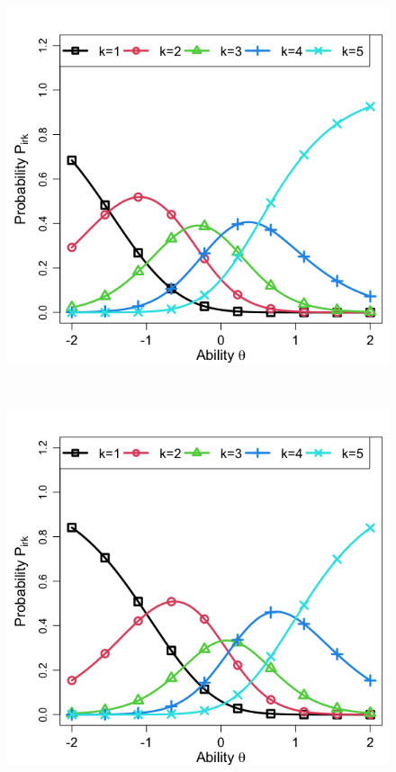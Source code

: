 \documentclass[a4paper,11pt,oneside,openany]{jsbook}
\begin{document}
\begin{center}
\begin{figure}[]
\begin{minipage}[b]{0.3\linewidth}
    \label{2}
  \end{minipage}
  \begin{minipage}[b]{0.3\linewidth}
    \centering
    \includegraphics[keepaspectratio,scale=0.22]{img/icc3.png}
    \label{3}
  \end{minipage}\\
  \begin{minipage}[b]{0.3\linewidth}
    \centering
    \includegraphics[keepaspectratio,scale=0.22]{img/icc4.png}

\end{minipage}
\end{figure}
\end{center}
\end{document}
